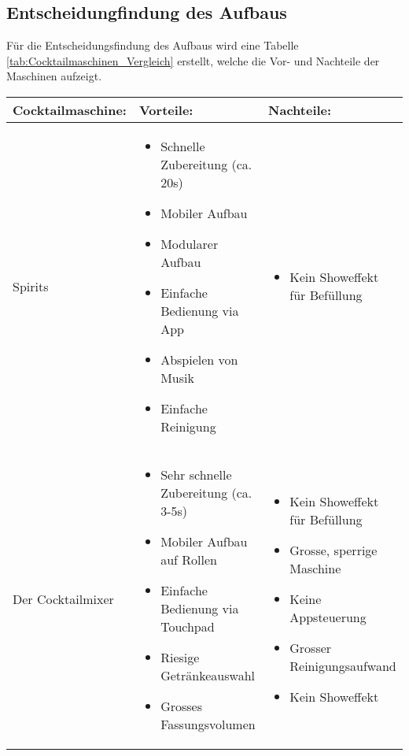 \subsection{Entscheidungfindung des Aufbaus}\label{subsec:Entscheidungfindung_des_Aufbaus}

Für die Entscheidungsfindung des Aufbaus wird eine Tabelle \ref{tab:Cocktailmaschinen_Vergleich} erstellt, welche die Vor- und Nachteile der Maschinen aufzeigt.
\newline

\begin{table}[h!]
\begin{tabularx}{\textwidth}{|l|X|X|}
\hline

\textbf{Cocktailmaschine:} & \textbf{Vorteile:} & \textbf{Nachteile:} 
\\
\hline

Spirits &

\begin{itemize}[leftmargin=0.3cm,label={--}]
\item Schnelle Zubereitung (ca. 20s)
\item Mobiler Aufbau
\item Modularer Aufbau
\item Einfache Bedienung via App
\item Abspielen von Musik
\item Einfache Reinigung
\end{itemize}   &

\begin{itemize}[leftmargin=0.3cm,label={--}]
\item Kein Showeffekt für Befüllung
\end{itemize}   \\
\hline

Der Cocktailmixer & 

\begin{itemize}[leftmargin=0.3cm,label={--}]
\item Sehr schnelle Zubereitung (ca. 3-5s)
\item Mobiler Aufbau auf Rollen
\item Einfache Bedienung via Touchpad
\item Riesige Getränkeauswahl
\item Grosses Fassungsvolumen
\end{itemize}   & 

\begin{itemize}[leftmargin=0.3cm,label={--}]
\item Kein Showeffekt für Befüllung
\item Grosse, sperrige Maschine
\item Keine Appsteuerung
\item Grosser Reinigungsaufwand
\item Kein Showeffekt
\end{itemize}   \\
\hline


\end{tabularx}
\end{table}
